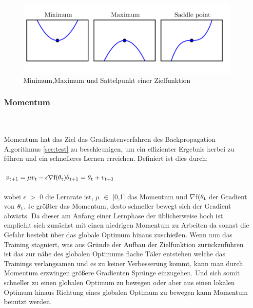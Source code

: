 \documentclass{llncs}
\begin{document}
\begin{figure}[htbp] 
	\centering
	\includegraphics[width=1.0\textwidth]{saddle.png}
	\caption{Minimum,Maximum und Sattelpunkt einer Zielfunktion \protect\cite{saddleimage}}
	\label{fig:Bild5}
\end{figure}


\subsubsection{Momentum}\label{sec:momentum}
~\\\\
Momentum hat das Ziel das Gradientenverfahren des Backpropagation Algorithmus \ref{sec:test} zu beschleunigen, um ein effizienter Ergebnis herbei zu führen und ein schnelleres Lernen erreichen. Definiert ist dies durch:
\\\\
\begin{math}
v\textsubscript{t+1} =\mu v\textsubscript{t}-\epsilon\nabla$f$(\theta\textsubscript{t})
\theta\textsubscript{t+1}= \theta\textsubscript{t}+v\textsubscript{t+1}
\end{math}
\\\\
wobei $\epsilon$ $>$ 0 die Lernrate ist,  $\mu$ $\in$ [0,1] das Momentum und $\nabla$f$(\theta\textsubscript{t}$ der Gradient von $\theta\textsubscript{t}$. Je größter das Momentum, desto schneller bewegt sich der Gradient abwärts. Da dieser am Anfang einer Lernphase der üblicherweise hoch ist empfiehlt sich zunächst mit einen niedrigen Momentum zu Arbeiten da sonnst die Gefahr besteht über das globale Optimum hinaus zuschießen. Wenn nun das Training stagniert, was aus Gründe der Aufbau der Zielfunktion zurückzuführen ist das zur nähe des globalen Optimums flache Täler entstehen welche das Trainings verlangsamen und es zu keiner Verbesserung kommt, kann man durch Momentum erzwingen größere Gradienten Sprünge einzugehen. Und sich somit schneller zu einen globalen Optimum zu bewegen oder aber aus einen lokalen Optimum hinaus Richtung eines globalen Optimum zu bewegen kann Momentum benutzt werden\cite{momentum}.
\end{document}
